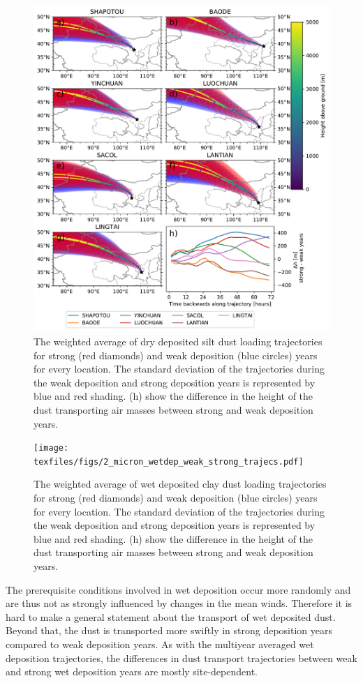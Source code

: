 \begin{figure}[htbp]
    \centering
    \includegraphics[width=\textwidth]{texfiles/figs/20_micron_drydep_weak_strong_trajecs.pdf}
    \caption{The weighted average of dry deposited silt dust loading trajectories for strong (red diamonds) and weak deposition (blue circles) years for every location. The standard deviation of the trajectories during the weak deposition and strong deposition years is represented by blue and red shading. (h) show the difference in the height of the dust transporting air masses between strong and weak deposition years. }
    \label{fig:strong_weak_drydepo_year_20mmu_trajecs}
\end{figure}


\begin{figure}[htbp]
    \centering
    \texttt{[image: texfiles/figs/2\_micron\_wetdep\_weak\_strong\_trajecs.pdf]}
    \caption{The weighted average of wet deposited clay dust loading trajectories for strong (red diamonds) and weak deposition (blue circles) years for every location. The standard deviation of the trajectories during the weak deposition and strong deposition years is represented by blue and red shading.  (h) show the difference in the height of the dust transporting air masses between strong and weak deposition years. }
    \label{fig:strong_weak_wetdepo_year_2mmu_trajecs}
\end{figure}
The prerequisite conditions involved in wet deposition occur more randomly and are thus not as strongly influenced by changes in the mean winds. 
Therefore it is hard to make a general statement about the transport of wet deposited dust. Beyond that, the dust is transported more swiftly in strong deposition years compared to weak deposition years. 
As with the multiyear averaged wet deposition trajectories, the differences in dust transport trajectories between weak and strong wet deposition years are mostly site-dependent. 

